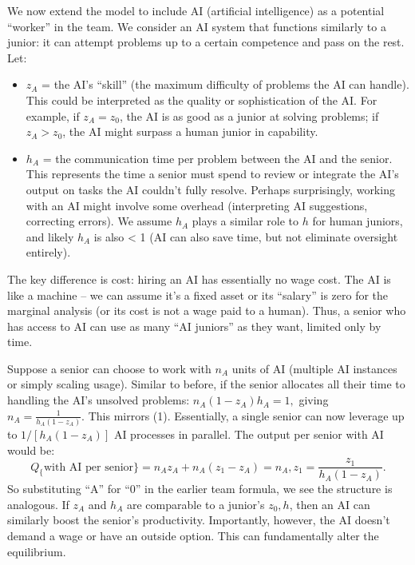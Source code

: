 \documentclass[12pt]{article}
\begin{document}
We now extend the model to include {AI (artificial intelligence)}
as a potential ``worker'' in the team. We consider an AI system that
functions similarly to a junior: it can attempt problems up to a certain
competence and pass on the rest. Let:

\begin{itemize}

\item
  \(z_A\) = the AI's ``skill'' (the maximum difficulty of problems the
  AI can handle). This could be interpreted as the quality or
  sophistication of the AI. For example, if \(z_A = z_0\), the AI is as
  good as a junior at solving problems; if \(z_A > z_0\), the AI might
  surpass a human junior in capability.
\item
  \(h_A\) = the communication time per problem between the AI and the
  senior. This represents the {time a senior must spend to review
  or integrate the AI's output on tasks the AI couldn't fully resolve}.
  Perhaps surprisingly, working with an AI might involve some overhead
  (interpreting AI suggestions, correcting errors). We assume \(h_A\)
  plays a similar role to \(h\) for human juniors, and likely \(h_A\) is
  also <{} 1 (AI can also save time, but not eliminate oversight
  entirely).
\end{itemize}

The key difference is {cost:} hiring an AI has essentially
{no wage cost}. The AI is like a machine -- we can assume it's a
fixed asset or its ``salary'' is zero for the marginal analysis (or its
cost is not a wage paid to a human). Thus, a senior who has access to AI
can use as many ``AI juniors'' as they want, limited only by time.

Suppose a senior can choose to work with {\(n_A\) units of AI}
(multiple AI instances or simply scaling usage). Similar to before, if
the senior allocates all their time to handling the AI's unsolved
problems: \(n_A (1 - z_A) h_A = 1,\) giving
\(n_A = \frac{1}{h_A(1-z_A)}.\) This mirrors (1). Essentially, a
single senior can now leverage up to \(1/[h_A(1-z_A)]\) AI processes in
parallel. The {output per senior with AI} would be: 
\begin{equation}
Q_\{\text{with AI per senior}\} = n_A z_A + n_A (z_1 - z_A) =
n_A, z_1 = \frac{z_1}{h_A(1-z_A)}. \tag{7}
\end{equation}
So substituting
``A'' for ``0'' in the earlier team formula, we see the structure is
analogous. If \(z_A\) and \(h_A\) are comparable to a junior's
\(z_0, h\), then an AI can similarly boost the senior's productivity.
{Importantly, however, the AI doesn't demand a wage or have an
outside option.} This can fundamentally alter the equilibrium.
\end{document}
